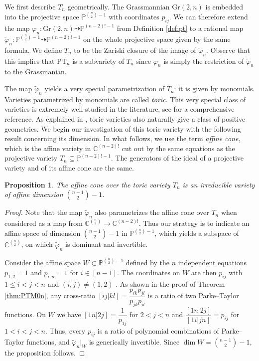 \documentclass[12pt, reqno]{amsart}
\numberwithin{equation}{section}
\theoremstyle{plain}
\newtheorem{proposition}[theorem]{Proposition}
\theoremstyle{definition}
\newcommand{\cc}{\mathbb{C}}
\begin{document}
We first describe $T_n$ geometrically. The Grassmannian $\mathrm{Gr}(2,n)$ is embedded into the projective space $\mathbb{P}^{\binom{n}{2}-1}$ with coordinates $p_{ij}$. We can therefore extend the map $\varphi_n: \mathrm{Gr}(2,n)\dashrightarrow \mathbb{P}^{(n-2)!-1}$ from Definition \ref{def:pt} to a rational map $\tilde{\varphi}_n:\mathbb{P}^{\binom{n}{2}-1}\dashrightarrow \mathbb{P}^{(n-2)!-1}$ on the whole projective space given by the same formula. We define $T_n$ to be the Zariski closure of the image of $\tilde{\varphi}_n$. Observe that this implies that $\mathrm{PT}_n$ is a subvariety of $T_n$ since $\varphi_n$ is simply the restriction of $\tilde{\varphi}_n$ to the Grassmanian.  

The map $\tilde{\varphi}_n$ yields a very special parametrization of $T_n$: it is given by monomials. Varieties parametrized by monomials are called \emph{toric}. This very special class of varieties is extremely well-studied in the literature, see \cite{cox2011toric} for a comprehensive reference. As explained in \cite[Section 3.3]{Lam2022PosGeom}, toric varieties also naturally give a class of positive geometries. We begin our investigation of this toric variety with the following result concerning its dimension. In what follows, we use the term \emph{affine cone}, which is the affine variety in $\mathbb{C}^{(n-2)!}$ cut out by the same equations as the projective variety $T_n\subseteq \mathbb{P}^{(n-2)!-1}$. The generators of the ideal of a projective variety and of its affine cone are the same. 


\begin{proposition} \label{prop:toricdim}
    The affine cone over the toric variety $T_n$ is an irreducible variety of affine dimension $\binom{n-1}{2}-1$.
\end{proposition} 
\begin{proof}
Note that the map $\tilde{\varphi}_n$ also parametrizes the affine cone over $T_n$ when considered as a map from $\cc^{\binom{n}{2}} \to \cc^{(n-2)!}$. 
Thus our strategy is to indicate an affine space of dimension $\binom{n-1}{2}-1$ in $\mathbb{P}^{\binom{n}{2}-1}$, which yields a subspace of $\cc^{\binom{n}{2}}$, on which $\tilde{\varphi}_n$ is dominant and invertible. 
    
    Consider the affine space $W\subset\mathbb{P}^{\binom{n}{2}-1}$ defined by the $n$ independent equations $p_{1,2}=1$ and $p_{i,n}=1$ for $i\in[n-1]$. The coordinates on $W$ are then $p_{ij}$ with $1\leq i<j<n$ and $(i,j)\neq(1,2)$ . As shown in the proof of Theorem \ref{thm:PTM0n}, any cross-ratio $[ij|kl] = \dfrac{p_{ik}p_{jl}}{p_{jk}p_{il}}$ is a ratio of two Parke--Taylor functions. On $W$ we have $[1n|2j]=\dfrac{1}{p_{1j}}$ for $2<j<n$ and $\dfrac{[1n|2j]}{[1i|jn]}=p_{ij}$ for $1<i<j<n$. Thus, every $p_{ij}$ is a ratio of polynomial combinations of Parke--Taylor functions, and $\tilde{\varphi}_n|_W$ is generically invertible. Since $\dim W=\binom{n-1}{2}-1$, the proposition follows.
\end{proof}
\end{document}
